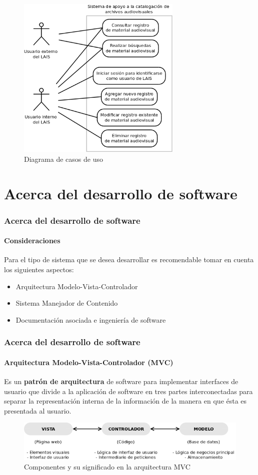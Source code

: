 \documentclass{beamer}
\begin{document}
\begin{frame}
	\begin{figure}[H]
		\centering
		\includegraphics[width=0.7\textwidth]{CasosDeUso.png}
		\caption{Diagrama de casos de uso}
		\label{fig:caso_de_uso}
	\end{figure}
\end{frame}

\section{Acerca del desarrollo de software}
\begin{frame}
	\frametitle{Acerca del desarrollo de software}
	\framesubtitle{Consideraciones}
	Para el tipo de sistema que se desea desarrollar es recomendable tomar en cuenta los siguientes aspectos:
	\begin{itemize}
		\item Arquitectura Modelo-Vista-Controlador
		\item Sistema Manejador de Contenido
		\item Documentación asociada e ingeniería de software
	\end{itemize}
\end{frame}

\begin{frame}
	\frametitle{Acerca del desarrollo de software}
	\framesubtitle{Arquitectura Modelo-Vista-Controlador (MVC)}
	Es un \textbf{patrón de arquitectura} de software para implementar interfaces de usuario que divide a la aplicación de software en tres partes interconectadas para separar la representación interna de la información de la manera en que ésta es presentada al usuario.
	
	\begin{figure}[H]
		\centering
		\includegraphics[keepaspectratio=true,width=\linewidth]{ModeloVistaControlador.png}
		\caption{Componentes y su significado en la arquitectura MVC}
		\label{fig:mvc}
	\end{figure}
\end{frame}
\end{document}
